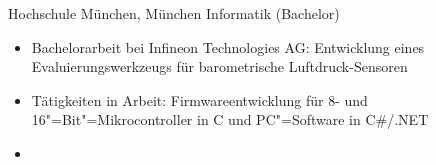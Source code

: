 \documentclass[%
               doublesided,
               paper=a4,
               fontsize=10pt
              ]{my-resume}
\begin{document}
{    
        {Hochschule München, München}
        {Informatik (Bachelor)}
        {\begin{itemize}
            \item Bachelorarbeit bei Infineon Technologies AG: Entwicklung eines Evaluierungswerkzeugs für barometrische Luftdruck-Sensoren
            \item Tätigkeiten in Arbeit: Firmwareentwicklung für 8- und 16"=Bit"=Mikrocontroller in C und PC"=Software in C\#/.NET
            \item[]   
        \end{itemize}}
    
    
}
\makebody
\clearpage
\end{document}
